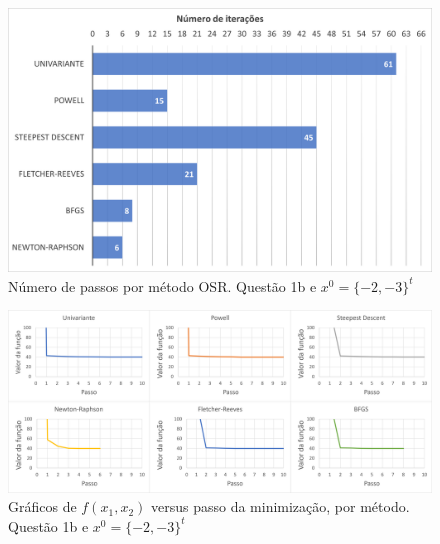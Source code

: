 \documentclass[10pt, a4paper]{article}
\begin{document}
\begin{figure}[H]
  \centering
  \includegraphics[scale=0.4]{figuras/q1b_passos_P2.PNG}
  \caption{Número de passos por método OSR. Questão 1b e $x^0 = \{-2,-3\}^t$ }
\end{figure}

\begin{figure}[H]
  \centering
  \includegraphics[scale=0.45]{figuras/q1b_fxpassos_P2.PNG}
  \caption{Gráficos de $f(x_1,x_2)$ versus passo da minimização, por método. Questão 1b e $x^0 = \{-2,-3\}^t$}
\end{figure}
\end{document}
